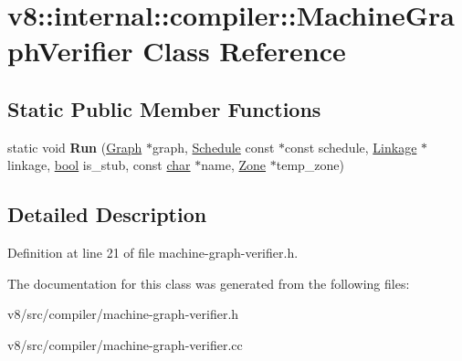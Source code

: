 \hypertarget{classv8_1_1internal_1_1compiler_1_1MachineGraphVerifier}{}\section{v8\+:\+:internal\+:\+:compiler\+:\+:Machine\+Graph\+Verifier Class Reference}
\label{classv8_1_1internal_1_1compiler_1_1MachineGraphVerifier}
\subsection*{Static Public Member Functions}
\begin{DoxyCompactItemize}
\item 
\mbox{\label{classv8_1_1internal_1_1compiler_1_1MachineGraphVerifier_a5d06b039add26bc4c73b78735e6e21b3}} 
static void {\bfseries Run} (\mbox{\hyperlink{classv8_1_1internal_1_1compiler_1_1Graph}{Graph}} $\ast$graph, \mbox{\hyperlink{classv8_1_1internal_1_1compiler_1_1Schedule}{Schedule}} const $\ast$const schedule, \mbox{\hyperlink{classv8_1_1internal_1_1compiler_1_1Linkage}{Linkage}} $\ast$linkage, \mbox{\hyperlink{classbool}{bool}} is\+\_\+stub, const \mbox{\hyperlink{classchar}{char}} $\ast$name, \mbox{\hyperlink{classv8_1_1internal_1_1Zone}{Zone}} $\ast$temp\+\_\+zone)
\end{DoxyCompactItemize}


\subsection{Detailed Description}


Definition at line 21 of file machine-\/graph-\/verifier.\+h.



The documentation for this class was generated from the following files\+:\begin{DoxyCompactItemize}
\item 
v8/src/compiler/machine-\/graph-\/verifier.\+h\item 
v8/src/compiler/machine-\/graph-\/verifier.\+cc\end{DoxyCompactItemize}
